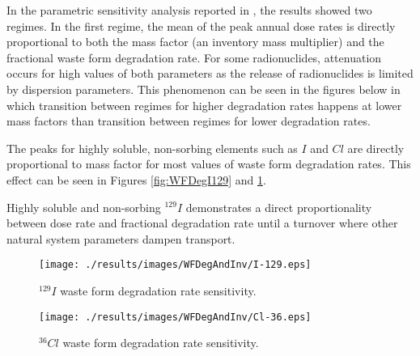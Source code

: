 In the parametric sensitivity analysis reported in \cite{huff_key_2012}, the
results showed two regimes. In the first regime, the mean of the peak annual
dose rates is directly proportional to both the mass factor (an inventory mass
multiplier) and the fractional waste form degradation rate. For some
radionuclides, attenuation occurs for high values of both parameters as the
release of radionuclides is limited by dispersion parameters. This phenomenon
can be seen in the figures below in which transition between regimes for higher
degradation rates happens at lower mass factors than transition between regimes
for lower degradation rates.

The peaks for highly soluble, non-sorbing elements such as $I$ and $Cl$
are directly proportional to mass factor for most
values of waste form degradation rates. This effect can be seen in Figures
\ref{fig:WFDegI129} and \ref{fig:WFDegCl36}.


Highly soluble and non-sorbing $^{129}I$ demonstrates a direct proportionality between dose rate and
fractional degradation rate until a turnover where other natural system
parameters dampen transport.

\begin{figure}[ht!]
\begin{minipage}[b]{0.45\linewidth}
\centering
\texttt{[image: ./results/images/WFDegAndInv/I-129.eps]}
\caption{$^{129}I$ waste form degradation rate sensitivity.}
\label{fig:WFDegI129}

\end{minipage}
\hspace{0.05\linewidth}
\begin{minipage}[b]{0.45\linewidth}

\texttt{[image: ./results/images/WFDegAndInv/Cl-36.eps]}
\caption{$^{36}Cl$ waste form degradation rate sensitivity.}
\label{fig:WFDegCl36}
\end{minipage}
\end{figure}

\FloatBarrier
